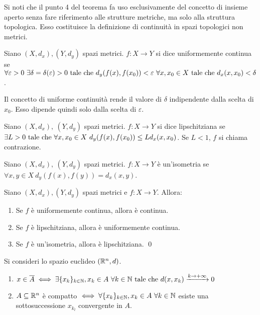 \begin{remark}
    Si noti che il punto 4 del teorema fa uso esclusivamente del concetto di insieme aperto senza fare riferimento alle strutture metriche, ma solo alla struttura topologica. Esso costituisce la definizione di continuità in spazi topologici non metrici.
\end{remark}

\begin{definition}
    Siano $(X, d_x), (Y, d_y)$ spazi metrici. $f : X \to Y$ si dice uniformemente continua se $\forall \varepsilon > 0 \ \exists \delta = \delta (\varepsilon) > 0 \text{ tale che } d_y(f(x), f(x_0)) < \varepsilon \ \forall x,x_0 \in X \text{ tale che } d_x(x, x_0) < \delta$.
\end{definition}

\begin{remark}
    Il concetto di uniforme continuità rende il valore di $\delta$ indipendente dalla scelta di $x_0$. Esso dipende quindi solo dalla scelta di $\varepsilon$.
\end{remark}

\begin{definition}
    Siano $(X, d_x),\ (Y, d_y)$ spazi metrici. $f: X \to Y$ si dice lipschitziana se $\exists L > 0 \text{ tale che } \forall x, x_0 \in X \ d_y(f(x), f(x_0)) \leq Ld_x(x, x_0)$. Se $L<1$, $f$ si chiama contrazione.
\end{definition}

\begin{definition}
    [Isometria]
    Siano $(X, d_x),\ (Y, d_y)$ spazi metrici. $f: X \to Y$ è un'isometria se $\forall x, y \in X \ d_y(f(x), f(y)) = d_x(x,y)$.
\end{definition}

\begin{theorem}
    Siano $(X, d_x), (Y, d_y)$ spazi metrici e $f:X \to Y$. Allora:
    \begin{enumerate}
        \item Se $f$ è uniformemente continua, allora è continua.
        \item Se $f$ è lipschitziana, allora è uniformemente continua.
        \item Se $f$ è un'isometria, allora è lipschitziana.
        \qed
    \end{enumerate}
\end{theorem}

\begin{prop}
    Si consideri lo spazio euclideo $(\mathbb{R}^n,d)$.
    \begin{enumerate}
        \item $x \in \overline{A} \iff \exists \{x_k\}_{k\in \mathbb{N}}, x_k \in A \ \forall k \in \mathbb{N} \text{ tale che } d(x, x_k) \xrightarrow{k \to + \infty} 0$

        \item $A \subseteq \mathbb{R}^n$ è compatto $\iff \forall\{x_k\}_{k\in \N}, x_k \in A \ \forall k \in \N$ esiste una sottosuccessione $x_{k_l}$ convergente in $A$.
    \end{enumerate}
\end{prop}

